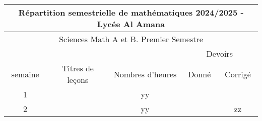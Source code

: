 \documentclass{article}
\begin{document}
\begin{table}[]
  \begin{tabular}{|ccccc|}
  \hline
  \multicolumn{5}{|c|}{Répartition semestrielle de mathématiques 2024/2025 - Lycée Al Amana}                                                                                                                                                                                                                                                   \\ \hline
  \multicolumn{5}{|c|}{Sciences Math A et B. Premier Semestre}                                                                                                                                                                                                                                                                                 \\ \hline
  \rowcolor[HTML]{68CBD0} 
  \multicolumn{1}{|c|}{\cellcolor[HTML]{68CBD0}}                          & \multicolumn{1}{c|}{\cellcolor[HTML]{68CBD0}}                                   & \multicolumn{1}{c|}{\cellcolor[HTML]{68CBD0}}                                   & \multicolumn{2}{c|}{\cellcolor[HTML]{68CBD0}Devoirs}                                           \\ \cline{4-5} 
  \multicolumn{1}{|c|}{\multirow{-2}{*}{\cellcolor[HTML]{68CBD0}semaine}} & \multicolumn{1}{c|}{\multirow{-2}{*}{\cellcolor[HTML]{68CBD0}Titres de leçons}} & \multicolumn{1}{c|}{\multirow{-2}{*}{\cellcolor[HTML]{68CBD0}Nombres d’heures}} & \multicolumn{1}{c|}{Donné}                                           & Corrigé                 \\ \hline
  \multicolumn{1}{|c|}{1}                                                 & \multicolumn{1}{c|}{}                                                           & \multicolumn{1}{c|}{\cellcolor[HTML]{CD9934}yy}                                 & \multicolumn{1}{c|}{}                                                &                         \\ \cline{1-1} \cline{3-5} 
  \multicolumn{1}{|c|}{2}                                                 & \multicolumn{1}{c|}{}                                                           & \multicolumn{1}{c|}{\cellcolor[HTML]{CD9934}yy}                                 & \multicolumn{1}{c|}{}                                                & zz                      \\ \cline{1-1} \cline{3-5} 

\end{tabular}
\end{table}
\end{document}
